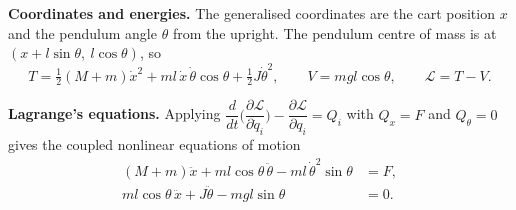 \documentclass[10pt,a4paper]{article}
\begin{document}
\textbf{Coordinates and energies.} The generalised coordinates are the cart position $x$ and the pendulum
angle $\theta$ from the upright. The pendulum centre of mass is at $(x+l\sin\theta,\ l\cos\theta)$, so
\begin{equation}
T = \tfrac12 (M+m)\dot x^2 + m l\,\dot x\,\dot\theta\cos\theta + \tfrac12 J\dot\theta^2,\qquad
V = m g l\cos\theta,\qquad \mathcal L = T - V .
\end{equation}

\textbf{Lagrange's equations.} Applying
$\dfrac{d}{dt}\Big(\dfrac{\partial\mathcal L}{\partial\dot q_i}\Big)-\dfrac{\partial\mathcal L}{\partial q_i}=Q_i$
with $Q_x = F$ and $Q_\theta = 0$ gives the coupled nonlinear equations of motion
\begin{align}
(M+m)\ddot x + m l\cos\theta\,\ddot\theta - m l\,\dot\theta^2\sin\theta &= F, \label{eq:eom1}\\
m l\cos\theta\,\ddot x + J\ddot\theta - m g l\sin\theta &= 0 . \label{eq:eom2}
\end{align}
\end{document}

